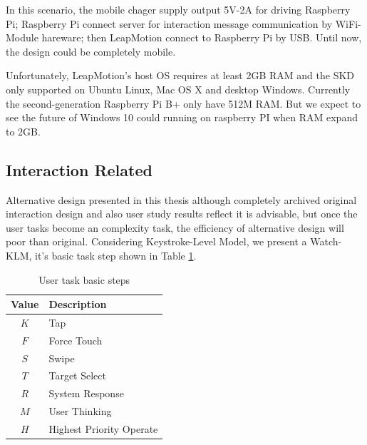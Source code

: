 In this scenario, the mobile chager supply output 5V-2A for driving Raspberry Pi; Raspberry Pi connect server for interaction message communication by WiFi-Module hareware; then LeapMotion connect to Raspberry Pi by USB. Until now, the design could be completely mobile.

Unfortunately, LeapMotion's host OS requires at least 2GB RAM and the SKD only supported on Ubuntu Linux, Mac OS X and desktop Windows. Currently the second-generation Raspberry Pi B+ only have 512M RAM. But we expect to see the future of Windows 10 could running on raspberry PI when RAM expand to 2GB.

\subsection{Interaction Related}


Alternative design presented in this thesis although completely archived original interaction design and also user study results reflect it is advisable, but once the user tasks become an complexity task, the efficiency of alternative design will poor than original. Considering Keystroke-Level Model\cite{Card:1980:KMU:358886.358895}, we present a Watch-KLM, it's basic task step shown in Table \ref{table:task}.

\begin{table}[H]
    \small
    \kaishu
    \centering
    \setlength{\belowcaptionskip}{10pt}
    \caption{User task basic steps}

    \begin{tabular}{c l}
        \toprule
        \textbf{Value}        & \textbf{Description} \\
        \hline
        $K$     & Tap \\
        $F$     & Force Touch \\
        $S$     & Swipe \\
        $T$     & Target Select \\
        $R$     & System Response \\
        $M$     & User Thinking \\
        $H$     & Highest Priority Operate \\
        \bottomrule
    \end{tabular}

    \label{table:task}
\end{table}

